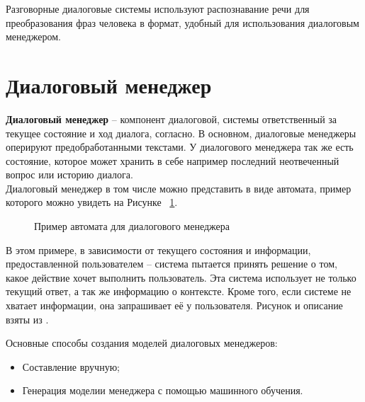 \documentclass[times,specification,annotation]{itmo-student-thesis}
\begin{document}
	Разговорные диалоговые системы используют распознавание речи для преобразования фраз человека в формат, удобный для использования диалоговым менеджером.
	
	\section{Диалоговый менеджер}
	
	\textbf{Диалоговый менеджер} -- компонент диалоговой, системы ответственный за текущее состояние и ход диалога, согласно\cite{wiki:dialog-system}. В основном, диалоговые менеджеры оперируют предобработанными текстами. У диалогового менеджера так же есть состояние, которое может хранить в себе например последний неотвеченный вопрос или историю диалога.\\%
	
	Диалоговый менеджер в том числе можно представить в виде автомата, пример которого можно увидеть на Рисунке ~\ref{fig:manager_sample}.
	
	\begin{figure}[H]
		\caption{Пример автомата для диалогового менеджера}
		\label{fig:manager_sample}
	\end{figure}

	В этом примере, в зависимости от текущего состояния и информации, предоставленной пользователем -- система пытается принять решение о том, какое действие хочет выполнить пользователь. Эта система использует не только текущий ответ, а так же информацию о контексте. Кроме того, если системе не хватает информации, она запрашивает её у пользователя. Рисунок и описание взяты из \cite{inproceedings}.
	
	Основные способы создания моделей диалоговых менеджеров:
	\begin{itemize}
		\item Составление вручную;
		\item Генерация моделии менеджера с помощью машинного обучения.
	\end{itemize}
\end{document}
